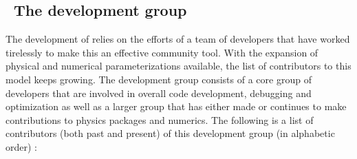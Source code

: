\vssub
\subsection{~The development group}
\vssub

The development of \ww  relies on the efforts of a team of developers that have worked tirelessly to make this an effective community tool. With the expansion of physical and numerical parameterizations available, the list of contributors to this model keeps growing. The development group consists of a core group of developers that are involved in overall code development, debugging and optimization as well as a larger group that has either made or continues to make contributions to physics packages and numerics. The following is a list of contributors (both past and present) of this development group (in alphabetic order) :

